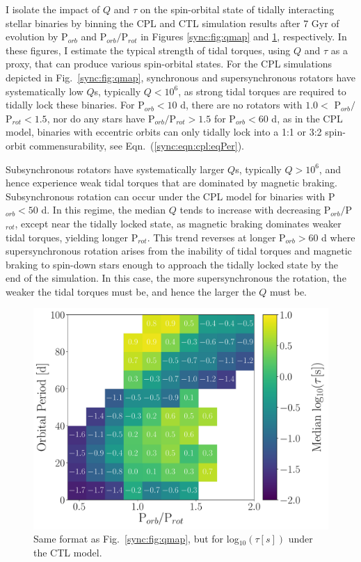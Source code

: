 I isolate the impact of $Q$ and $\tau$ on the spin-orbital state of tidally interacting stellar binaries by binning the CPL and CTL simulation results after 7 Gyr of evolution by P$_{orb}$ and P$_{orb}/$P$_{rot}$ in Figures \ref{sync:fig:qmap} and \ref{sync:fig:taumap}, respectively. In these figures, I estimate the typical strength of tidal torques, using $Q$ and $\tau$ as a proxy, that can produce various spin-orbital states. For the CPL simulations depicted in Fig.~\ref{sync:fig:qmap}, synchronous and supersynchronous rotators have systematically low $Q$s, typically $Q < 10^6$, as strong tidal torques are required to tidally lock these binaries. For P$_{orb} < 10$ d, there are no rotators with $1.0 <$ P$_{orb}/$P$_{rot} < 1.5$, nor do any stars have P$_{orb}/$P$_{rot} > 1.5$ for P$_{orb} < 60$ d, as in the CPL model, binaries with eccentric orbits can only tidally lock into a 1:1 or 3:2 spin-orbit commensurability, see Eqn.~(\ref{sync:eqn:cpl:eqPer}).   

Subsynchronous rotators have systematically larger $Q$s, typically $Q > 10^6$, and hence experience weak tidal torques that are dominated by magnetic braking.  Subsynchronous rotation can occur under the CPL model for binaries with P$_{orb} < 50$ d. In this regime, the median $Q$ tends to increase with decreasing P$_{orb}/$P$_{rot}$, except near the tidally locked state, as magnetic braking dominates weaker tidal torques, yielding longer P$_{rot}$.  This trend reverses at longer P$_{orb} > 60$ d where supersynchronous rotation arises from the inability of tidal torques and magnetic braking to spin-down stars enough to approach the tidally locked state by the end of the simulation.  In this case, the more supersynchronous the rotation, the weaker the tidal torques must be, and hence the larger the $Q$ must be. 

\begin{figure}
	\includegraphics[width=\columnwidth]{porbProtPorbTauHist.pdf}
   \caption{Same format as Fig.~\ref{sync:fig:qmap}, but for log$_{10}(\tau [s])$ under the CTL model. }%
    \label{sync:fig:taumap}%
\end{figure}

